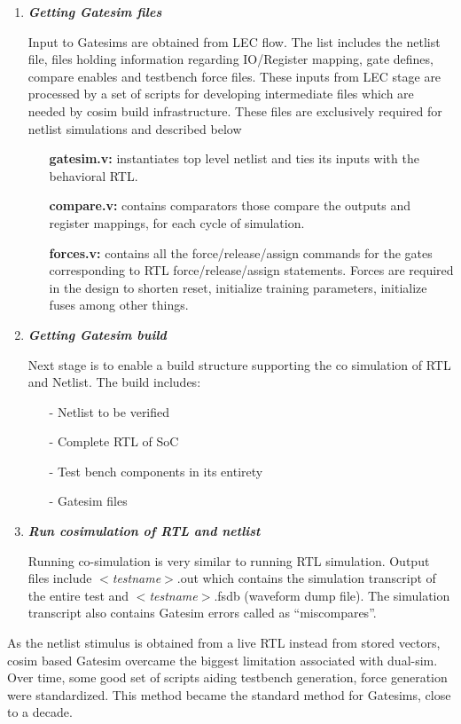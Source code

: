 \begin{enumerate}
	\item \emph{\bf Getting Gatesim files}

	Input to Gatesims are obtained from LEC flow. The list includes the netlist file, files holding information regarding IO/Register mapping, gate defines, compare enables and testbench force files. These inputs from LEC stage are processed by a set of scripts for developing intermediate files which are needed by cosim build infrastructure. These files are exclusively required for netlist simulations and described below
	\begin{itemize}
		\item[]{\bf gatesim.v:} instantiates top level netlist and ties its inputs with the behavioral RTL.
		\item[]{\bf compare.v:} contains comparators those compare the outputs and register mappings, for each cycle of simulation.
		\item[]{\bf forces.v:} contains all the force/release/assign commands for the gates corresponding to RTL force/release/assign statements. Forces are required in the design to shorten reset, initialize training parameters, initialize fuses among other things.
	\end{itemize}

	\item \emph{\bf Getting Gatesim build} 

	Next stage is to enable a build structure supporting the co simulation of RTL and Netlist. The build includes:
	\begin{itemize}
		\item[-]Netlist to be verified
		\item[-]Complete RTL of SoC
		\item[-]Test bench components in its entirety
		\item[-]Gatesim files
	\end{itemize}

	\item \emph{\bf Run cosimulation of RTL and netlist}

	Running co-simulation is very similar to running RTL simulation. Output files include $<${\it testname}$>$.out which contains the simulation transcript of the entire test and $<${\it testname}$>$.fsdb (waveform dump file). The simulation transcript also contains Gatesim errors called as ``miscompares''.
\end{enumerate}


As the netlist stimulus is obtained from a live RTL instead from stored vectors, cosim based Gatesim overcame the biggest limitation associated with dual-sim. Over time, some good set of scripts aiding testbench generation, force generation were standardized. This method became the standard method for Gatesims, close to a decade.

